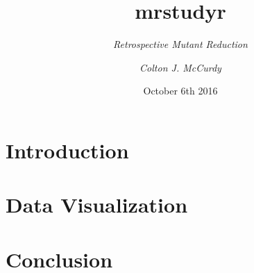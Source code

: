 \documentclass[hyperref={pdfpagemode=FullScreen},xcolor=dvipsnames]{beamer}
\title{mrstudyr}
\subtitle{\textit{Retrospective Mutant Reduction}}
\author{\textit{Colton J. McCurdy}}
\date{October 6th 2016}
\begin{document}
\kTitleFrame


\section{Introduction}


\section{Data Visualization}


\section{Conclusion}


\end{document}
